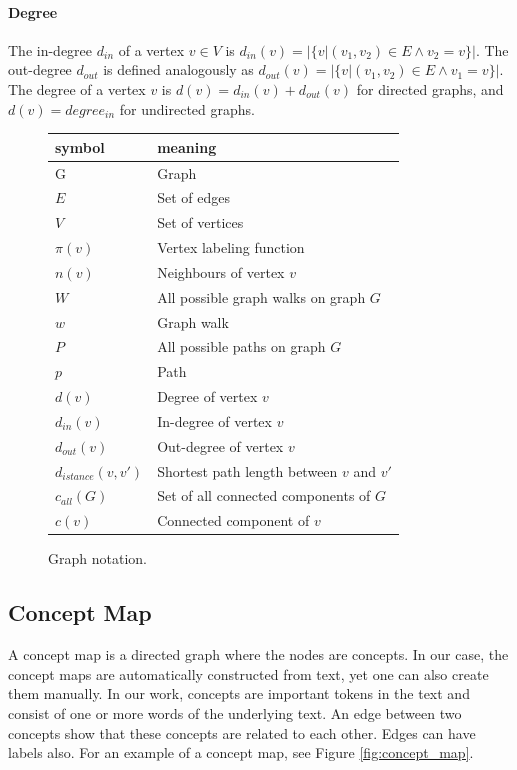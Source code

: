 \paragraph{Degree}
The in-degree $d_{in}$ of a vertex $v \in V$ is $d_{in}(v) = |\{v | (v_1, v_2) \in E \land v_2 = v\}|$.
The out-degree $d_{out}$ is defined analogously as $d_{out}(v) = |\{v | (v_1, v_2) \in E \land v_1 = v\}|$.
The degree of a vertex $v$ is $d(v) = d_{in}(v) + d_{out}(v)$ for directed graphs, and $d(v) = degree_{in}$ for undirected graphs.

\begin{figure}[htb!]
\centering
\begin{tabular}{ll}
symbol &  meaning \\
\midrule
G & Graph \\
$E$ & Set of edges \\
$V$ & Set of vertices \\
$\pi(v)$ & Vertex labeling function \\
$n(v)$ & Neighbours of vertex $v$ \\
$W$ & All possible graph walks on graph $G$ \\
$w$ & Graph walk \\
$P$ & All possible paths on graph $G$ \\
$p$ & Path \\
$d(v)$ & Degree of vertex $v$ \\
$d_{in}(v)$ & In-degree of vertex $v$ \\
$d_{out}(v)$ & Out-degree of vertex $v$ \\
$d_{istance}(v, v')$ & Shortest path length between $v$ and $v'$ \\
$c_{all}(G)$ & Set of all connected components of $G$ \\
$c(v)$ & Connected component of $v$ \\
\end{tabular}
\caption[Notation: Graphs]{Graph notation.}
\end{figure}

\subsection{Concept Map}
A concept map \cite{Novak1984, Kinchin2000, Falke2017b,Gulrandhe2015, Valerio2008} is a directed graph where the nodes are concepts. In our case, the concept maps are automatically constructed from text, yet one can also create them manually.
In our work, concepts are important tokens in the text and consist of one or more words of the underlying text.
An edge between two concepts show that these concepts are related to each other. Edges can have labels also.
For an example of a concept map, see Figure \ref{fig:concept_map}.

